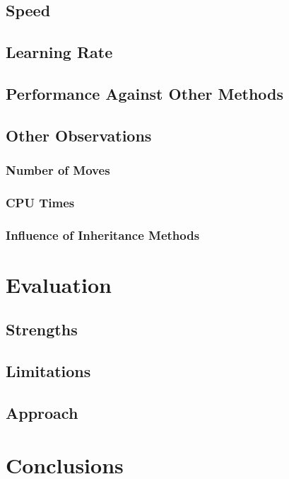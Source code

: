 \documentclass[12pt,a4paper]{article}
\begin{document}
    \subsection{Speed}
    \subsection{Learning Rate}
    \subsection{Performance Against Other Methods}
    \subsection{Other Observations}
        \subsubsection{Number of Moves}
        \subsubsection{CPU Times}
        \subsubsection{Influence of Inheritance Methods}


\section{Evaluation}
    \subsection{Strengths}
    \subsection{Limitations}
    \subsection{Approach}

\section{Conclusions}



\end{document}
